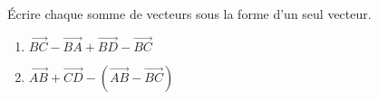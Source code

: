 
Écrire chaque somme de vecteurs sous la forme d'un seul vecteur.
\begin{enumerate}
\item $\overrightarrow{BC}-\overrightarrow{BA}+\overrightarrow{BD}-\overrightarrow{BC}$
\item $\overrightarrow{AB}+\overrightarrow{CD}- \left(\overrightarrow{AB}-\overrightarrow{BC} \right)$
\end{enumerate}